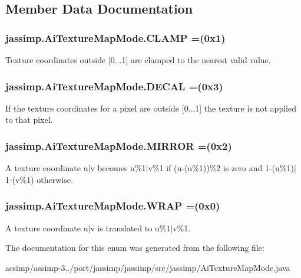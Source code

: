 \subsection{Member Data Documentation}
\hypertarget{enumjassimp_1_1_ai_texture_map_mode_aa1f9a6f04fe4545ffbe69cf42559d8ce}{
\subsubsection[{C\+L\+A\+M\+P}]{\setlength{\rightskip}{0pt plus 5cm}jassimp.\+Ai\+Texture\+Map\+Mode.\+C\+L\+A\+M\+P =(0x1)}}\label{enumjassimp_1_1_ai_texture_map_mode_aa1f9a6f04fe4545ffbe69cf42559d8ce}
Texture coordinates outside \mbox{[}0...1\mbox{]} are clamped to the nearest valid value. \hypertarget{enumjassimp_1_1_ai_texture_map_mode_ab2c9025bdb3239db16d681f368bb61ac}{
\subsubsection[{D\+E\+C\+A\+L}]{\setlength{\rightskip}{0pt plus 5cm}jassimp.\+Ai\+Texture\+Map\+Mode.\+D\+E\+C\+A\+L =(0x3)}}\label{enumjassimp_1_1_ai_texture_map_mode_ab2c9025bdb3239db16d681f368bb61ac}
If the texture coordinates for a pixel are outside \mbox{[}0...1\mbox{]} the texture is not applied to that pixel. \hypertarget{enumjassimp_1_1_ai_texture_map_mode_ab6ad139b097429504f972893a22da90e}{
\subsubsection[{M\+I\+R\+R\+O\+R}]{\setlength{\rightskip}{0pt plus 5cm}jassimp.\+Ai\+Texture\+Map\+Mode.\+M\+I\+R\+R\+O\+R =(0x2)}}\label{enumjassimp_1_1_ai_texture_map_mode_ab6ad139b097429504f972893a22da90e}
A texture coordinate u$\vert$v becomes u\%1$\vert$v\%1 if (u-\/(u\%1))\%2 is zero and 1-\/(u\%1)$\vert$1-\/(v\%1) otherwise. \hypertarget{enumjassimp_1_1_ai_texture_map_mode_a3c555f48584add1d53a6d091bd7c9500}{
\subsubsection[{W\+R\+A\+P}]{\setlength{\rightskip}{0pt plus 5cm}jassimp.\+Ai\+Texture\+Map\+Mode.\+W\+R\+A\+P =(0x0)}}\label{enumjassimp_1_1_ai_texture_map_mode_a3c555f48584add1d53a6d091bd7c9500}
A texture coordinate u$\vert$v is translated to u\%1$\vert$v\%1. 

The documentation for this enum was generated from the following file\+:\begin{DoxyCompactItemize}
\item 
assimp/assimp-\/3../port/jassimp/jassimp/src/jassimp/Ai\+Texture\+Map\+Mode.\+java\end{DoxyCompactItemize}
